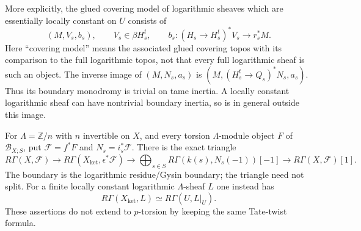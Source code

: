 More explicitly, the glued covering model of logarithmic sheaves
which are essentially locally constant on $U$ consists of
\[
 (M,V_s,b_s),\qquad
 V_s\in\beta H_s^t,\qquad
 b_s:(H_s\to H_s^t)^*V_s\longrightarrow r_s^*M.
\]
Here ``covering model'' means the associated glued covering
topos with its comparison to the full logarithmic topos, not
that every full logarithmic sheaf is such an object.
The inverse image of $(M,N_s,a_s)$ is
$(M,(H_s^t\to Q_s)^*N_s,a_s)$. Thus its boundary monodromy
is trivial on tame inertia. A locally constant logarithmic
sheaf can have nontrivial boundary inertia, so is in general
outside this image.

For $\Lambda=\mathbb Z/n$ with $n$ invertible on $X$, and every
torsion $\Lambda$-module object $F$ of $\mathcal B_{X;S}$, put
$\mathcal F=f^*F$ and $N_s=i_s^*\mathcal F$. There is the exact
triangle
\[
 R\Gamma(X,\mathcal F)\longrightarrow
 R\Gamma(X_{\mathrm{ket}},\epsilon^*\mathcal F)
 \longrightarrow
 \bigoplus_{s\in S}R\Gamma(k(s),N_s(-1))[-1]
 \longrightarrow R\Gamma(X,\mathcal F)[1].                 \tag{B.9.1}
\]
The boundary is the logarithmic residue/Gysin boundary; the
triangle need not split. For a finite locally constant
logarithmic $\Lambda$-sheaf $L$ one instead has
\[
 R\Gamma(X_{\mathrm{ket}},L)\simeq R\Gamma(U,L|_U).
                                                               \tag{B.9.2}
\]
These assertions do not extend to $p$-torsion by keeping the
same Tate-twist formula.

